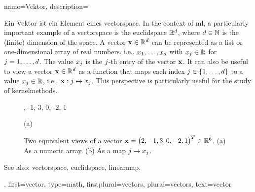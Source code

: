 {name={Vektor},
	description={Ein  Vektor ist ein Element eines \gls{vectorspace}. 
		In the context of \gls{ml}, a particularly important example of a \gls{vectorspace} 
		is the \gls{euclidspace} $\mathbb{R}^{d}$, where $d \in \mathbb{N}$ 
		is the (finite) dimension of the space. A vector ${\bf x} \in \mathbb{R}^{d}$ 
		can be represented as a list or one-dimensional array of real numbers, i.e., 
		$x_1, \ldots, x_{d}$ with $x_j \in \mathbb{R}$ for 
		$j = 1, \ldots, d$. The value $x_j$ is the $j$-th 
		entry of the vector ${\bf x}$. It can also be useful to view a vector ${\bf x} \in \mathbb{R}^{d}$ 
		as a \gls{function} that maps each index $j \in \{1, \ldots, d\}$ 
		to a value $x_j \in \mathbb{R}$, i.e., ${\bf x}: j \mapsto x_j$. 
		This perspective is particularly useful for the study of \glspl{kernelmethod}.
		\begin{figure}[H]
			\begin{minipage}[c]{0.48\textwidth}
				, -1, 3, 0, -2, 1
				\begin{minipage}{\textwidth}
				\vspace{5ex}
				\centering
				{\selectfont (a)}
				\end{minipage}
			\end{minipage}
			\hfill
			\begin{minipage}{0.48\textwidth}
			\centering
			\end{minipage}
			\caption{Two equivalent views of a vector ${\bf x}= \big( 2, -1, 3, 0, -2, 1 \big)^{T} \in \mathbb{R}^{6}$.
			(a) As a numeric array. (b) As a \gls{map} $j \mapsto x_j$.}
			\label{fig:vector-function-dual_dict}
		\end{figure}
		See also: \gls{vectorspace}, \gls{euclidspace}, \gls{linearmap}.},
	first={vector},
	type=math,
	firstplural={vectors},
	plural={vectors},
	text={vector}
}


